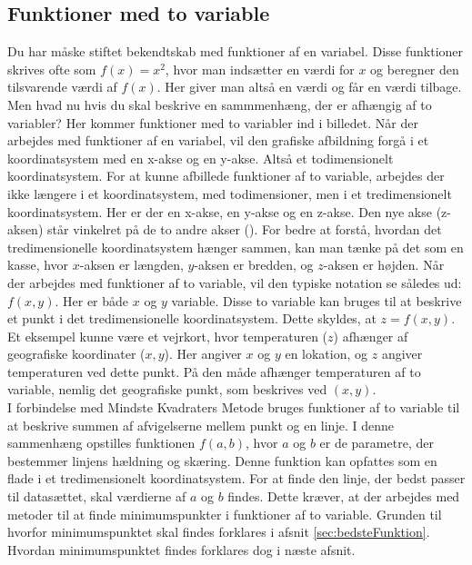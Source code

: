 \subsection{Funktioner med to variable}\label{sec:FunktionerMedToVariable}
Du har måske stiftet bekendtskab med funktioner af en variabel. Disse funktioner skrives ofte som $f(x) = x^2$, hvor man indsætter en værdi for $x$ og beregner den tilsvarende værdi af $f(x)$. Her giver man altså en værdi og får en værdi tilbage. Men hvad nu hvis du skal beskrive en sammmenhæng, der er afhængig af to variabler? Her kommer funktioner med to variabler ind i billedet. Når der arbejdes med funktioner af en variabel, vil den grafiske afbildning forgå i et koordinatsystem med en x-akse og en y-akse. Altså et todimensionelt koordinatsystem. For at kunne afbillede funktioner af to variable, arbejdes der ikke længere i et koordinatsystem, med todimensioner, men i et tredimensionelt koordinatsystem. Her er der en x-akse, en y-akse og en z-akse. Den nye akse (z-aksen) står vinkelret på de to andre akser (\cite[246-248]{funktionrAfToVariable}). For bedre at forstå, hvordan det tredimensionelle koordinatsystem hænger sammen, kan man tænke på det som en kasse, hvor  $x$-aksen er længden, $y$-aksen er bredden, og $z$-aksen er højden. Når der arbejdes med funktioner af to variable, vil den typiske notation se således ud: $f(x,y)$. Her er både $x$ og $y$ variable. Disse to variable kan bruges til at beskrive et punkt i det tredimensionelle koordinatsystem. Dette skyldes, at $z = f(x,y)$. Et eksempel kunne være et vejrkort, hvor temperaturen ($z$) afhænger af geografiske koordinater ($x, y$). Her angiver $x$ og $y$ en lokation, og $z$ angiver temperaturen ved dette punkt. På den måde afhænger temperaturen af to variable, nemlig det geografiske punkt, som beskrives ved $(x, y)$. \\
I forbindelse med Mindste Kvadraters Metode bruges funktioner af to variable til at beskrive summen af afvigelserne mellem punkt og en linje. I denne sammenhæng opstilles funktionen $f(a, b)$, hvor $a$ og $b$ er de parametre, der bestemmer linjens hældning og skæring. Denne funktion kan opfattes som en flade i et tredimensionelt koordinatsystem. 
For at finde den linje, der bedst passer til datasættet, skal værdierne af $a$ og $b$ findes. Dette kræver, at der arbejdes med metoder til at finde minimumspunkter i funktioner af to variable. Grunden til hvorfor minimumspunktet skal findes forklares i afsnit \ref{sec:bedsteFunktion}. Hvordan minimumspunktet findes forklares dog i næste afsnit.


